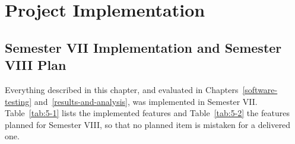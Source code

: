 \documentclass[12pt,a4paper,oneside]{report}
\begin{document}
\endgroup

\clearpage

\chapter{Project Implementation}\label{project-implementation}

\section{Semester VII Implementation and Semester VIII Plan}\label{sem7-vs-sem8}

Everything described in this chapter, and evaluated in Chapters~\ref{software-testing} and~\ref{results-and-analysis}, was implemented in Semester VII. Table~\ref{tab:5-1} lists the implemented features and Table~\ref{tab:5-2} the features planned for Semester VIII, so that no planned item is mistaken for a delivered one.
\end{document}
